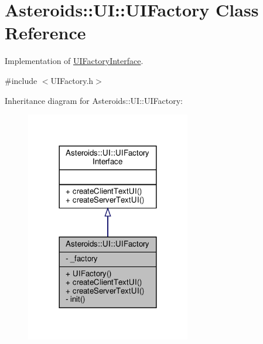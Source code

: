 \hypertarget{classAsteroids_1_1UI_1_1UIFactory}{}\section{Asteroids\+:\+:UI\+:\+:U\+I\+Factory Class Reference}
\label{classAsteroids_1_1UI_1_1UIFactory}


Implementation of \hyperlink{classAsteroids_1_1UI_1_1UIFactoryInterface}{U\+I\+Factory\+Interface}.  




{\ttfamily \#include $<$U\+I\+Factory.\+h$>$}



Inheritance diagram for Asteroids\+:\+:UI\+:\+:U\+I\+Factory\+:\nopagebreak
\begin{figure}[H]
\begin{center}
\leavevmode
\includegraphics[width=204pt]{classAsteroids_1_1UI_1_1UIFactory__inherit__graph}
\end{center}
\end{figure}


